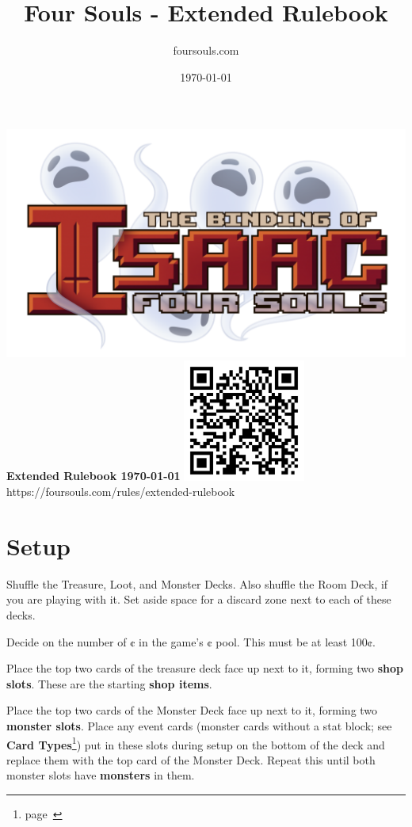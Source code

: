 \documentclass[
  fontsize=10pt,
  paper=a5,
  version=last,
  chapterprefix=true,
  bindingoffset=5mm,
  ]{scrbook}
\title{Four Souls - Extended Rulebook}
\author{foursouls.com}
\date{\today}
\begin{document}
    \begin{titlepage}
        \centering
        \includegraphics[width=\textwidth]{assets/foursouls.png}\\
        {\bfseries\LARGE
        Extended Rulebook
        \vfill
        \Large\today
        }
        \vfill
        \includegraphics[width=4cm]{assets/qr-code.pdf}\\
        https://foursouls.com/rules/extended-rulebook
    \end{titlepage}
    \tableofcontents

    \chapter{Setup}
    \label{setup}
    Shuffle the Treasure, Loot, and Monster Decks. Also shuffle the Room Deck, if you are playing with it. Set aside space for a discard zone next to each of these decks.

    Decide on the number of ¢ in the game’s ¢ pool. This must be at least 100¢.

    Place the top two cards of the treasure deck face up next to it, forming two \textbf{shop slots}. These are the starting \textbf{shop items}.

    Place the top two cards of the Monster Deck face up next to it, forming two \textbf{monster slots}. Place any event cards (monster cards without a stat block; see \textbf{Card Types}\footnote{page~\pageref{types}}) put in these slots during setup on the bottom of the deck and replace them with the top card of the Monster Deck. Repeat this until both monster slots have \textbf{monsters} in them.
\end{document}
